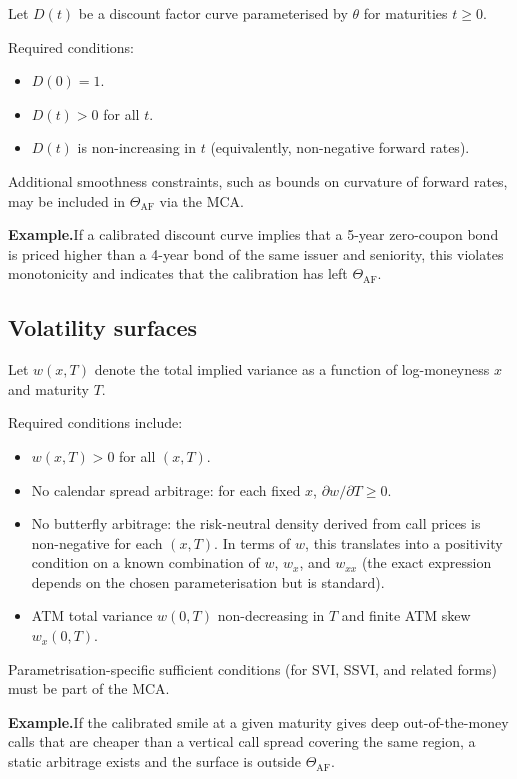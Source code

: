 \documentclass[11pt,a4paper]{article}
\begin{document}
Let $D(t)$ be a discount factor curve parameterised by $\theta$ for maturities $t \geq 0$.

Required conditions:
\begin{itemize}
    \item $D(0) = 1$.
    \item $D(t) > 0$ for all $t$.
    \item $D(t)$ is non-increasing in $t$ (equivalently, non-negative forward rates).
\end{itemize}

Additional smoothness constraints, such as bounds on curvature of forward rates, may be included in $\Theta_{\text{AF}}$ via the MCA.

\textbf{Example.}\quad If a calibrated discount curve implies that a 5-year zero-coupon bond is priced higher than a 4-year bond of the same issuer and seniority, this violates monotonicity and indicates that the calibration has left $\Theta_{\text{AF}}$.

\subsection{Volatility surfaces}

Let $w(x, T)$ denote the total implied variance as a function of log-moneyness $x$ and maturity $T$.

Required conditions include:
\begin{itemize}
    \item $w(x, T) > 0$ for all $(x, T)$.
    \item No calendar spread arbitrage: for each fixed $x$, $\partial w / \partial T \geq 0$.
    \item No butterfly arbitrage: the risk-neutral density derived from call prices is non-negative for each $(x, T)$. In terms of $w$, this translates into a positivity condition on a known combination of $w$, $w_x$, and $w_{xx}$ (the exact expression depends on the chosen parameterisation but is standard).
    \item ATM total variance $w(0, T)$ non-decreasing in $T$ and finite ATM skew $w_x(0, T)$.
\end{itemize}

Parametrisation-specific sufficient conditions (for SVI, SSVI, and related forms) must be part of the MCA.

\textbf{Example.}\quad If the calibrated smile at a given maturity gives deep out-of-the-money calls that are cheaper than a vertical call spread covering the same region, a static arbitrage exists and the surface is outside $\Theta_{\text{AF}}$.
\end{document}
